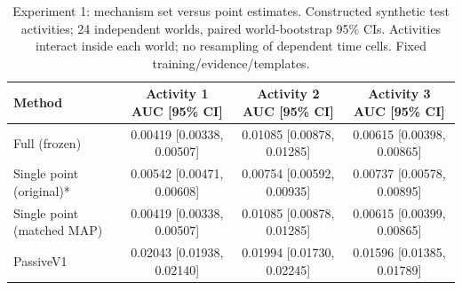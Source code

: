 \begin{table}[t]
\centering
\small
\caption{Experiment 1: mechanism set versus point estimates. Constructed synthetic test activities; 24 independent worlds, paired world-bootstrap 95\% CIs. Activities interact inside each world; no resampling of dependent time cells. Fixed training/evidence/templates.}
\begin{tabular}{lccc}
\toprule
Method & Activity 1 AUC [95\% CI] & Activity 2 AUC [95\% CI] & Activity 3 AUC [95\% CI] \\
\midrule
Full (frozen) & 0.00419 [0.00338, 0.00507] & 0.01085 [0.00878, 0.01285] & 0.00615 [0.00398, 0.00865] \\
Single point (original)* & 0.00542 [0.00471, 0.00608] & 0.00754 [0.00592, 0.00935] & 0.00737 [0.00578, 0.00895] \\
Single point (matched MAP) & 0.00419 [0.00338, 0.00507] & 0.01085 [0.00878, 0.01285] & 0.00615 [0.00399, 0.00865] \\
PassiveV1 & 0.02043 [0.01938, 0.02140] & 0.01994 [0.01730, 0.02245] & 0.01596 [0.01385, 0.01789] \\
\bottomrule
\end{tabular}
\end{table}
